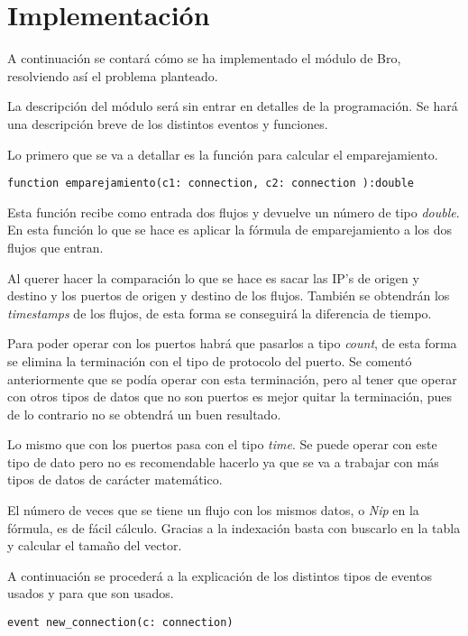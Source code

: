 \chapter{Implementación}

A continuación se contará cómo se ha implementado el módulo de Bro, resolviendo así el problema planteado.

\intro La descripción del módulo será sin entrar en detalles de la programación. Se hará una descripción 
breve de los distintos eventos y funciones.

\intro Lo primero que se va a detallar es la función para calcular el emparejamiento.

\begin{lstlisting}[style=CodigoC]
function emparejamiento(c1: connection, c2: connection ):double 

\end{lstlisting}

\intro Esta función recibe como entrada dos flujos y devuelve un número de tipo \textit{double}. En esta función 
lo que se hace es aplicar la fórmula de emparejamiento a los dos flujos que entran.

\intro Al querer hacer la comparación lo que se hace es sacar las IP's de origen y destino y los puertos de 
origen y destino de los flujos. También se obtendrán los \textit{timestamps} de los flujos, de esta forma se 
conseguirá la diferencia de tiempo. 

\intro Para poder operar con los puertos habrá que pasarlos a tipo \textit{count}, de esta forma se elimina la 
terminación con el tipo de protocolo del puerto. Se comentó anteriormente que se podía operar con esta terminación, 
pero al tener que operar con otros tipos de datos que no son puertos es mejor quitar la terminación, pues de lo 
contrario no se obtendrá un buen resultado. 

\intro Lo mismo que con los puertos pasa con el tipo \textit{time}. Se puede operar con este tipo de dato 
pero no es recomendable hacerlo ya que se va a trabajar con más tipos de datos de carácter matemático.

\intro El número de veces que se tiene un flujo con los mismos datos, o \textit{Nip} en la fórmula, es de fácil 
cálculo. Gracias a la indexación basta con buscarlo en la tabla y calcular el tamaño del vector. 

\intro A continuación se procederá a la explicación de los distintos tipos de eventos usados y para que son usados.

\begin{lstlisting}[style=CodigoC]
event new_connection(c: connection)

\end{lstlisting}


